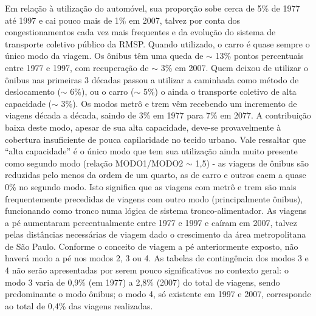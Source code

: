 Em relação à utilização do automóvel, sua proporção sobe cerca de 5\% de 1977 até 1997 e cai pouco mais de 1\% em 2007, talvez por conta dos congestionamentos cada vez mais frequentes e da evolução do sistema de transporte coletivo público da RMSP. Quando utilizado, o carro é quase sempre o único modo da viagem.
Os ônibus têm uma queda de $\sim$ 13\% pontos percentuais entre 1977 e 1997, com recuperação de $\sim$ 3\% em 2007. Quem deixou de utilizar o ônibus nas primeiras 3 décadas passou a utilizar a caminhada como método de deslocamento ($\sim$ 6\%), ou o carro ($\sim$ 5\%) o ainda o transporte coletivo de alta capacidade ($\sim$ 3\%).
Os modos metrô e trem vêm recebendo um incremento de viagens década a década, saindo de 3\% em 1977 para 7\% em 2077. A contribuição baixa deste modo, apesar de sua alta capacidade, deve-se provavelmente à cobertura insuficiente de pouca capilaridade no tecido urbano.
Vale ressaltar que ``alta capacidade'' é o único modo que tem sua utilização ainda muito presente como segundo modo (relação MODO1/MODO2 $\sim$ 1,5) - as viagens de ônibus são reduzidas pelo menos da ordem de um quarto, as de carro e outros caem a quase 0\% no segundo modo.
Isto significa que as viagens com metrô e trem são mais frequentemente precedidas de viagens com outro modo (principalmente ônibus), funcionando como tronco numa lógica de sistema tronco-alimentador.
As viagens a pé aumentaram percentualmente entre 1977 e 1997 e caíram em 2007, talvez pelas distâncias necessárias de viagem dado o crescimento da área metropolitana de São Paulo. Conforme o conceito de viagem a pé anteriormente exposto, não haverá modo a pé nos modos 2, 3 ou 4.
As tabelas de contingência dos modos 3 e 4 não serão apresentadas por serem pouco significativos no contexto geral: o modo 3 varia de 0,9\% (em 1977) a 2,8\% (2007) do total de viagens, sendo predominante o modo ônibus; o modo 4, só existente em 1997 e 2007, corresponde ao total de 0,4\% das viagens realizadas.

